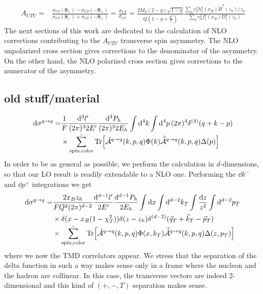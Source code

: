 \begin{equation}
\begin{aligned}
    A_{UTU}=&\frac{\sigma_{UT}(\boldsymbol{S_\perp})-\sigma_{UT}(-\boldsymbol{S_\perp})}{\sigma_{UT}(\boldsymbol{S_\perp})+\sigma_{UT}(-\boldsymbol{S_\perp})}=\frac{\sigma_{UT}}{\sigma_{UU}}= \frac{2M_h(2-y)\sqrt{1-y}}{Q(1-y+\frac{y^2}{2})}\frac{ \sum_a e_a^2 h_1^a(x_B)\tilde{H}^a(z_h)/z_h}{\sum_a e_a^2 f_1^a(x_B)D_1^a(z_h)}
\end{aligned}
\end{equation}
The next sections of this work are dedicated to the calculation of NLO corrections contributing to the $A_{UTU}$ transverse spin asymmetry. The NLO unpolarized cross section gives corrections to the denominator of the asymmetry. On the other hand, the NLO polarized cross section gives corrections to the numerator of the asymmetry.



\newpage
\subsection{old stuff/material}
\begin{equation}
\begin{aligned}
        \dd \sigma^{q \to q} = &\frac{1}{F}\frac{\dd ^3l'}{(2\pi)^3 2E'}\frac{\dd^3P_h}{(2\pi)^3 2E_h}\int \dd^4k\int \dd^4p \,(2\pi)^4 \delta^{(4)}(q+k-p)\\&\times\bar{\sum_{\text{spin,color}}}\Tr[\hat{\mathcal{A}}^{q\to q}(k,p,q) \Phi(k)\hat{\bar{\mathcal{A}}}^{q\to q}(k,p,q)\Delta(p)]
\end{aligned}
\end{equation}
In order to be as general as possible, we perform the calculation in $d$-dimensions, so that our LO result is readily extendable to a NLO one. Performing the $\dd k^-$ and $\dd p^+$ integrations we get
\begin{equation}\label{eq:sigmaqqv1}
    \begin{aligned}
        \dd \sigma^{q \to q} = &\frac{2x_B z_h}{FQ^2(2\pi)^{d-2}}\frac{\dd ^{d-1}l'}{2E'}\frac{\dd^{d-1}P_h}{ 2E_h}\int \dd x \int \dd^{d-2}k_T\int \frac{\dd z}{z^2}\int \dd^{d-2}p_T \,\\
        &\times\delta(x-x_B(1-\chi_T^2))\delta(z-z_h)\delta^{(d-2)}(\vec q_T+\vec k_T-\vec p_T)\\&\times\bar{\sum_{\text{spin,color}}}\Tr[\hat{\mathcal{A}}^{q\to q}(k,p,q) \Phi(x,k_T)\hat{\bar{\mathcal{A}}}^{q\to q}(k,p,q)\Delta(z,p_T)]
    \end{aligned}
\end{equation}
where we now the TMD correlators appear. We stress that the separation of the delta function in such a way makes sense only in a frame where the nucleon and the hadron are collinear. In this case, the transverse vectors are indeed 2-dimensional and this kind of $(+,-,T)$ separation makes sense. \\

